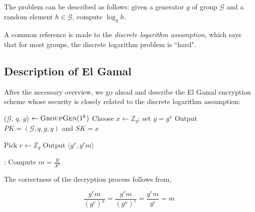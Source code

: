 The problem can be described as follows: given a generator $ g $ of group $ \mathcal{G} $ and a random element $ h \in \mathcal{G} $, compute $ \log_g h $.

A common reference is made to the \textit{discrete logarithm assumption}, which says that for most groups, the discrete logarithm problem is ``hard".

\subsection{Description of El Gamal}

After the necessary overview, we go ahead and describe the El Gamal encryption scheme whose security is closely related to the discrete logarithm assumption:

\begin{algorithmic}
\STATE ($ \mathcal{G} $, $ q $, $ g $) $ \leftarrow \textsc{GroupGen} (1^k) $ 
\STATE Choose $ x \leftarrow \mathbb{Z}_q $; set $ y = g^x $ 
\STATE Output $ PK = ( \mathcal{G}, q, g, y) $ and $ SK = x $ 
\end{algorithmic}

\begin{algorithmic}
\STATE Pick $ r \leftarrow \mathbb{Z}_q $ 
\STATE Output $ \langle g^r, y^r m \rangle $ 
\end{algorithmic}

\begin{algorithmic}
:
\STATE Compute $ m = \frac{B}{A^x} $ 
\end{algorithmic}

The correctness of the decryption process follows from,

\begin{equation*}
\frac{y^r m}{(g^r)^x} = \frac{y^r m}{(g^x)^r} = \frac{y^r m }{y^r} = m
\end{equation*}
